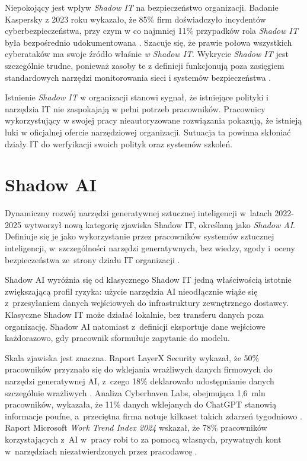 Niepokojący jest wpływ \textit{Shadow IT} na bezpieczeństwo organizacji. Badanie 
Kaspersky z 2023 roku wykazało, że 85\% firm doświadczyło incydentów cyberbezpieczeństwa, 
przy czym w co najmniej 11\% przypadków rola \textit{Shadow IT} była bezpośrednio 
udokumentowana \autocite{kaspersky2023}. Szacuje się, że prawie połowa wszystkich 
cyberataków ma swoje źródło właśnie \textit{w Shadow IT}. Wykrycie \textit{Shadow IT} jest szczególnie trudne, ponieważ zasoby te z definicji funkcjonują 
poza zasięgiem standardowych narzędzi monitorowania sieci i systemów bezpieczeństwa \autocite{isaca2024}.

Istnienie \textit{Shadow IT} w organizacji stanowi sygnał, że istniejące polityki i narzędzia IT nie zaspokajają w pełni potrzeb 
pracowników. Pracownicy wykorzystujący w swojej pracy  nieautoryzowane rozwiązania pokazują, że istnieją luki w oficjalnej ofercie narzędziowej organizacji.  Sutuacja ta powinna  skłoniać  działy IT do werfyikacji swoich polityk oraz systemów szkoleń\autocite{grip2025}.


\section{Shadow AI}

Dynamiczny rozwój narzędzi generatywnej sztucznej inteligencji w~latach 2022-2025 wytworzył nową kategorię zjawiska Shadow IT, określaną jako \textit{Shadow AI}. Definiuje się je jako wykorzystanie przez pracowników systemów sztucznej inteligencji, w~szczególności narzędzi generatywnych, bez wiedzy, zgody i~oceny bezpieczeństwa ze~strony działu IT organizacji \autocite{gartner2025crossborder}.

Shadow AI wyróżnia się od klasycznego Shadow IT jedną właściwością istotnie zwiększającą profil ryzyka: użycie narzędzia AI nieodłącznie wiąże się z~przesyłaniem danych wejściowych do infrastruktury zewnętrznego dostawcy. Klasyczne Shadow IT może działać lokalnie, bez transferu danych poza organizację. Shadow AI natomiast z~definicji eksportuje dane wejściowe każdorazowo, gdy pracownik sformułuje zapytanie do modelu.

Skala zjawiska jest znaczna. Raport LayerX Security wykazał, że 50\% pracowników przyznało się do wklejania wrażliwych danych firmowych do narzędzi generatywnej AI, z~czego 18\% deklarowało udostępnianie danych szczególnie wrażliwych \autocite{layerx_2025}. Analiza Cyberhaven Labs, obejmująca 1,6~mln pracowników, wykazała, że 11\% danych wklejanych do ChatGPT stanowią informacje poufne, a~przeciętna firma notuje kilkaset takich zdarzeń tygodniowo \autocite{cyberhaven_chatgpt}. Raport Microsoft \textit{Work Trend Index 2024} wskazał, że 78\% pracowników korzystających z~AI w~pracy robi to za pomocą własnych, prywatnych kont w~narzędziach niezatwierdzonych przez pracodawcę \autocite{microsoft2024worktrend}.

